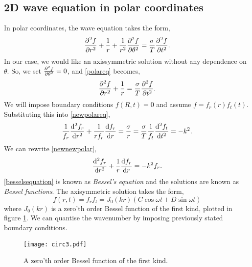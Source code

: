 \documentclass{book}
\begin{document}
\subsection{2D wave equation in polar coordinates}
In polar coordinates, the wave equation takes the form,
\begin{equation}
	\pdv[2]{f}{r} + \frac{1}{r} + \frac{1}{r^2}\pdv[2]{f}{\theta} = \frac{\sigma}{T}\pdv[2]{f}{t}. \label{polareq}
\end{equation}
In our case, we would like an axissymmetric solution without any dependence on $\theta$. So, we set $\pdv[2]{f}{\theta} = 0$, and \eqref{polareq} becomes,
\begin{equation}
	\pdv[2]{f}{r} + \frac{1}{r} = \frac{\sigma}{T}\pdv[2]{f}{t}. \label{newpolareq}
\end{equation}
We will impose boundary conditions $f(R,t) = 0$ and assume $f = f_r(r)f_t(t)$. Substituting this into \eqref{newpolareq},
\begin{equation}
	\frac{1}{f_r}\dv[2]{f_r}{r} + \frac{1}{rf_r}\dv{f_r}{r} = \frac{\sigma}{r} = \frac{\sigma}{T} \frac{1}{f_t}\dv[2]{f_t}{t} = -k^2. \label{newnewpolar}
\end{equation}
We can rewrite \eqref{newnewpolar},
\begin{equation}
	\dv[2]{f_r}{r} + \frac{1}{r}\dv{f_r}{r} = -k^2f_r. \label{besselsequation}
\end{equation}
\eqref{besselsequation} is known as \textit{Bessel's equation} and the solutions are known as \textit{Bessel functions}. The axisymmetric solution takes the form,
\begin{equation}
	f(r,t) = f_rf_t = J_0(kr)(C\cos\omega t + D\sin\omega t)
\end{equation}
where $J_0(kr)$ is a zero'th order Bessel function of the first kind, plotted in figure \ref{zeroth}. We can quantise the wavenumber by imposing previously stated boundary conditions.
\begin{figure}
	\centering
	\texttt{[image: circ3.pdf]}
	\caption{A zero'th order Bessel function of the first kind.}
	\label{zeroth}
\end{figure}
\end{document}
